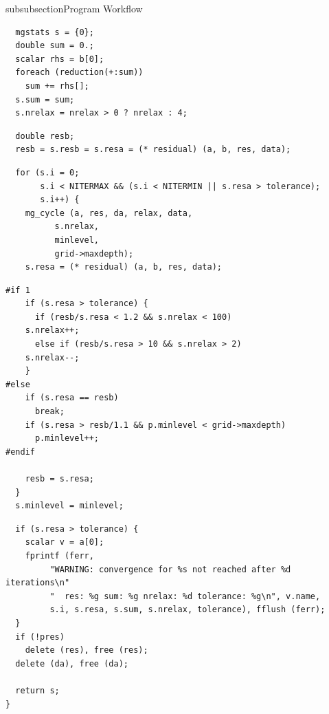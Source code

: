 \begin{codesection}{subsubsection}{Program Workflow}
\begin{verbatim}
  mgstats s = {0};
  double sum = 0.;
  scalar rhs = b[0];
  foreach (reduction(+:sum))
    sum += rhs[];
  s.sum = sum;
  s.nrelax = nrelax > 0 ? nrelax : 4;
\end{verbatim}
\codearrow
{}
\begin{verbatim}
  double resb;
  resb = s.resb = s.resa = (* residual) (a, b, res, data);
\end{verbatim}
\codearrow
{}
\begin{verbatim}
  for (s.i = 0;
       s.i < NITERMAX && (s.i < NITERMIN || s.resa > tolerance);
       s.i++) {
    mg_cycle (a, res, da, relax, data,
	      s.nrelax,
	      minlevel,
	      grid->maxdepth);
    s.resa = (* residual) (a, b, res, data);
\end{verbatim}
\codearrow
{}
\begin{verbatim}
#if 1
    if (s.resa > tolerance) {
      if (resb/s.resa < 1.2 && s.nrelax < 100)
	s.nrelax++;
      else if (resb/s.resa > 10 && s.nrelax > 2)
	s.nrelax--;
    }
#else
    if (s.resa == resb)
      break;
    if (s.resa > resb/1.1 && p.minlevel < grid->maxdepth)
      p.minlevel++;
#endif

    resb = s.resa;
  }
  s.minlevel = minlevel;
\end{verbatim}
\codearrow
{}
\begin{verbatim}
  if (s.resa > tolerance) {
    scalar v = a[0];
    fprintf (ferr, 
	     "WARNING: convergence for %s not reached after %d iterations\n"
	     "  res: %g sum: %g nrelax: %d tolerance: %g\n", v.name,
	     s.i, s.resa, s.sum, s.nrelax, tolerance), fflush (ferr);
  }
  if (!pres)
    delete (res), free (res);
  delete (da), free (da);

  return s;
}
\end{verbatim}
\end{codesection}

